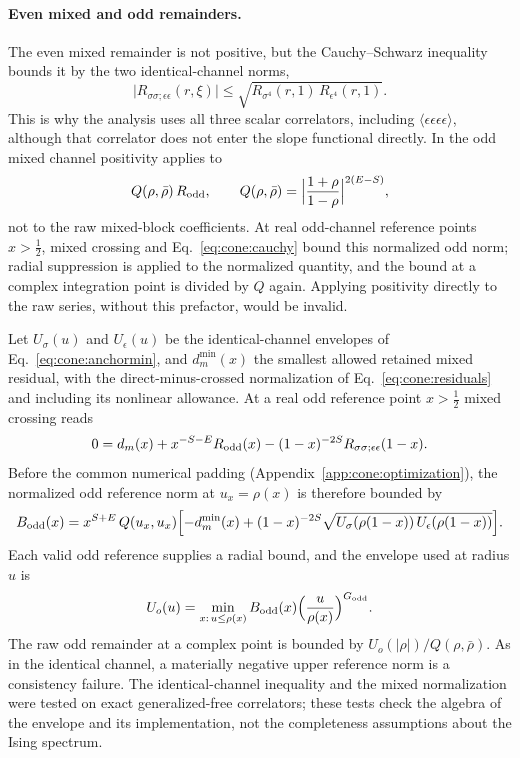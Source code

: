 \documentclass[11pt,a4paper]{article}
\numberwithin{equation}{section}
\begin{document}
\paragraph{Even mixed and odd remainders.} The even mixed remainder is not positive, but the Cauchy--Schwarz inequality
bounds it by the two identical-channel norms,
\begin{equation}
 \bigl|R_{\sigma\sigma;\epsilon\epsilon}(r,\xi)\bigr|\le\sqrt{R_{\sigma^4}(r,1)\,R_{\epsilon^4}(r,1)} .
 \label{eq:cone:cauchy}
\end{equation}
This is why the analysis uses all three scalar correlators, including $\langle\epsilon\epsilon\epsilon\epsilon\rangle$,
although that correlator does not enter the slope functional directly. In the odd mixed channel positivity applies to
\begin{equation}
 Q(\rho,\bar\rho)\,R_{\rm odd},\qquad Q(\rho,\bar\rho)=\Bigl|\frac{1+\rho}{1-\rho}\Bigr|^{2(E-S)},
 \label{eq:cone:Q}
\end{equation}
not to the raw mixed-block coefficients. At real odd-channel reference points $x>\frac12$, mixed crossing and
Eq.~\eqref{eq:cone:cauchy} bound this normalized odd norm; radial suppression is applied to the normalized quantity, and
the bound at a complex integration point is divided by $Q$ again. Applying positivity directly to the raw series,
without this prefactor, would be invalid.

Let $U_\sigma(u)$ and $U_\epsilon(u)$ be the identical-channel envelopes of Eq.~\eqref{eq:cone:anchormin}, and
$d_m^{\min}(x)$ the smallest allowed retained mixed residual, with the direct-minus-crossed normalization of
Eq.~\eqref{eq:cone:residuals} and including its nonlinear allowance. At a real odd reference point $x>\frac12$ mixed
crossing reads
\begin{equation}
 0=d_m(x)+x^{-S-E}R_{\rm odd}(x)-(1-x)^{-2S}R_{\sigma\sigma;\epsilon\epsilon}(1-x).
\end{equation}
Before the common numerical padding (Appendix~\ref{app:cone:optimization}), the normalized odd reference norm at
$u_x=\rho(x)$ is therefore bounded by
\begin{equation}
 B_{\rm odd}(x)=x^{S+E}\,Q(u_x,u_x)\Bigl[-d_m^{\min}(x)+(1-x)^{-2S}\sqrt{U_\sigma(\rho(1-x))\,U_\epsilon(\rho(1-x))}\Bigr].
 \label{eq:cone:oddanchor}
\end{equation}
Each valid odd reference supplies a radial bound, and the envelope used at radius $u$ is
\begin{equation}
 U_o(u)=\min_{x:\,u\le\rho(x)}B_{\rm odd}(x)\Bigl(\frac{u}{\rho(x)}\Bigr)^{G_{\rm odd}} .
 \label{eq:cone:oddenv}
\end{equation}
The raw odd remainder at a complex point is bounded by $U_o(|\rho|)/Q(\rho,\bar\rho)$. As in the identical channel, a
materially negative upper reference norm is a consistency failure. The identical-channel inequality and the mixed
normalization were tested on exact generalized-free correlators; these tests check the algebra of the envelope and its
implementation, not the completeness assumptions about the Ising spectrum.
\end{document}
